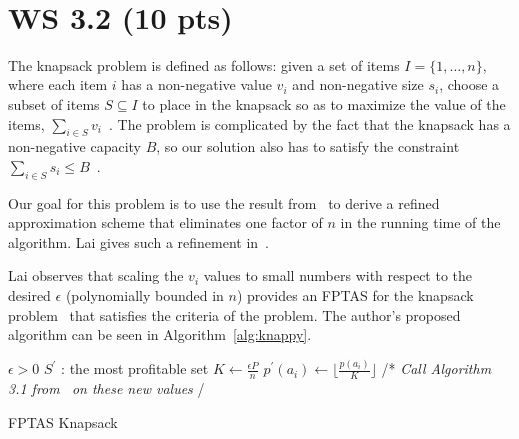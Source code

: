 \documentclass[conference]{../IEEEtran}
\newcommand{\LineComment}[1]{\Statex /* \hfill \textit{#1} \hfill*/}    %
\begin{document}
~\cite{toth2003}

\section{WS 3.2 (10 pts)} \label{prob3} %

The knapsack problem is defined as follows: given a set of items ${I = \lbrace
1,\ldots,n \rbrace}$, where each item $i$ has a non-negative value $v_i$ and
non-negative size $s_i$, choose a subset of items $S \subseteq I$ to place in
the knapsack so as to maximize the value of the items, ${\sum_{i \in S}
v_i}$~\cite{williamson2011}.  The problem is complicated by the fact that the
knapsack has a non-negative capacity $B$, so our solution also has to satisfy
the constraint ${\sum_{i \in S} s_i \leq B}$~\cite{williamson2011}.

Our goal for this problem is to use the result from~\cite[Problem
$3.1$]{williamson2011} to derive a refined approximation scheme that eliminates
one factor of $n$ in the running time of the algorithm.  Lai gives such a
refinement in~\cite{lai2006}.  

Lai observes that scaling the $v_i$ values to small numbers with respect to the
desired $\epsilon$ (polynomially bounded in $n$) provides an FPTAS for the
knapsack problem~\cite{lai2006} that satisfies the criteria of the problem.
The author's proposed algorithm can be seen in Algorithm~\ref{alg:knappy}.

\begin{algorithm}[ht!]
    \begin{algorithmic}[1]
      \Require $\epsilon > 0$
      \Ensure $S^\prime$ : the most profitable set
      \Statex
      \State $K \leftarrow \frac{\epsilon P}{n}$
        \State $p^\prime(a_i) \leftarrow \lfloor \frac{p(a_i)}{K} \rfloor$
      \EndFor
      \LineComment{Call Algorithm 3.1 from~\cite{williamson2011} on these new
      values}
    \end{algorithmic}
    \caption{FPTAS Knapsack}
    \label{alg:knappy}
\end{algorithm}

\end{document}
